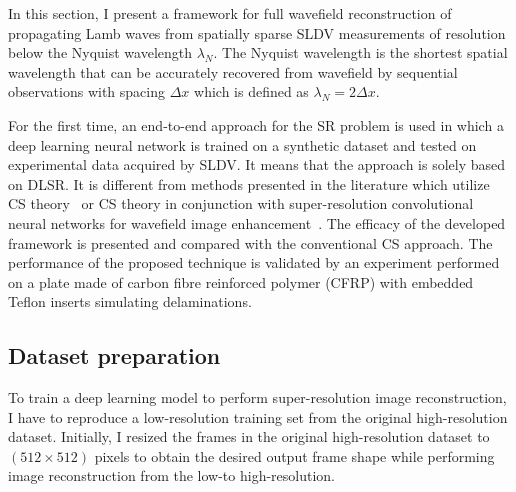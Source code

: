 
In this section, I present a framework for full wavefield reconstruction of propagating Lamb waves from spatially sparse SLDV measurements of resolution below the Nyquist wavelength $\lambda_N$. 
The Nyquist wavelength is the shortest spatial wavelength that can be accurately recovered from wavefield by sequential observations with spacing $\Delta x$ which is defined as $\lambda_N = 2 \Delta x$. 

For the first time, an end-to-end approach for the SR problem is used in which a deep learning neural network is trained on a synthetic dataset and tested on experimental data acquired by SLDV.
It means that the approach is solely based on DLSR.
It is different from methods presented in the literature which utilize CS theory~\cite{Harley2013, KeshmiriEsfandabadi2018} or CS theory in conjunction with super-resolution convolutional neural networks for wavefield image enhancement~\cite{Park2017a, KeshmiriEsfandabadi2020}.
The efficacy of the developed framework is presented and compared with the conventional CS approach.
The performance of the proposed technique is validated by an experiment performed on a plate made of carbon fibre reinforced polymer (CFRP) with embedded Teflon inserts simulating delaminations.

\subsection{Dataset preparation}
\label{sec451}
To train a deep learning model to perform super-resolution image reconstruction, I have to reproduce a low-resolution training set from the original high-resolution dataset.
Initially, I resized the frames in the original high-resolution dataset to \((512\times512)\) pixels to obtain the desired output frame shape while performing image reconstruction from the low-to high-resolution.



